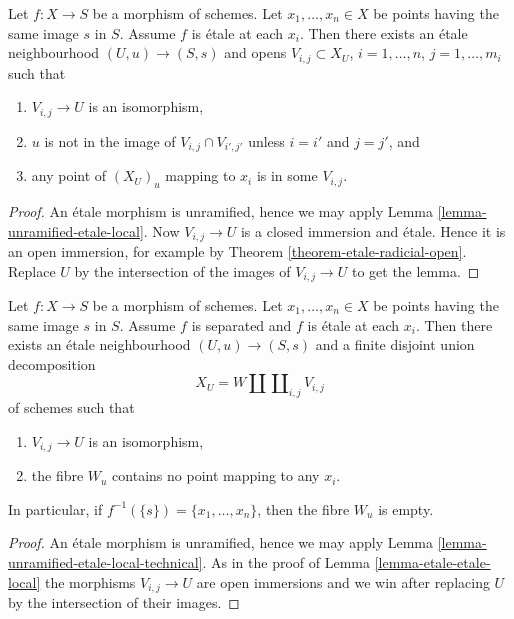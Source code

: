 \begin{lemma}
\label{lemma-etale-etale-local}
Let $f : X \to S$ be a morphism of schemes.
Let $x_1, \ldots, x_n \in X$ be points having the same image $s$ in $S$.
Assume $f$ is \'etale at each $x_i$.
Then there exists an \'etale neighbourhood $(U, u) \to (S, s)$
and opens $V_{i, j} \subset X_U$, $i = 1, \ldots, n$, $j = 1, \ldots, m_i$
such that
\begin{enumerate}
\item $V_{i, j} \to U$ is an isomorphism,
\item $u$ is not in the image of $V_{i, j} \cap V_{i', j'}$ unless
$i = i'$ and $j = j'$, and
\item any point of $(X_U)_u$ mapping to $x_i$ is in some $V_{i, j}$.
\end{enumerate}
\end{lemma}

\begin{proof}
An \'etale morphism is unramified, hence we may apply
Lemma \ref{lemma-unramified-etale-local}.
Now $V_{i, j} \to U$ is a closed immersion and \'etale.
Hence it is an open immersion, for example by
Theorem \ref{theorem-etale-radicial-open}.
Replace $U$ by the intersection of the images of $V_{i, j} \to U$
to get the lemma.
\end{proof}

\begin{lemma}
\label{lemma-etale-etale-local-technical}
Let $f : X \to S$ be a morphism of schemes.
Let $x_1, \ldots, x_n \in X$ be points having the same image $s$ in $S$.
Assume $f$ is separated and $f$ is \'etale at each $x_i$.
Then there exists an \'etale neighbourhood $(U, u) \to (S, s)$
and a finite disjoint union decomposition
$$
X_U =
W \amalg \coprod\nolimits_{i, j} V_{i, j}
$$
of schemes such that
\begin{enumerate}
\item $V_{i, j} \to U$ is an isomorphism,
\item the fibre $W_u$ contains no point mapping to any $x_i$.
\end{enumerate}
In particular, if $f^{-1}(\{s\}) = \{x_1, \ldots, x_n\}$, then
the fibre $W_u$ is empty.
\end{lemma}

\begin{proof}
An \'etale morphism is unramified, hence we may apply
Lemma \ref{lemma-unramified-etale-local-technical}.
As in the proof of
Lemma \ref{lemma-etale-etale-local}
the morphisms $V_{i, j} \to U$ are open immersions and
we win after replacing $U$ by the intersection of their
images.
\end{proof}

